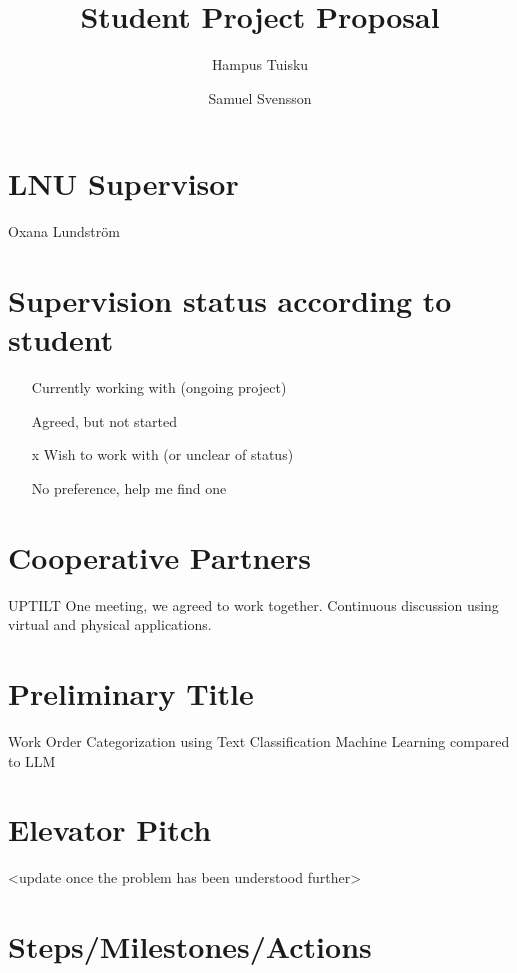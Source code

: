 \documentclass{article}
\title{Student Project Proposal}
\author{Hampus Tuisku \and Samuel Svensson}
\begin{document}
\maketitle

\section{LNU Supervisor}
Oxana Lundström

\section{Supervision status according to student}

\begin{itemize}
\item [ ] Currently working with (ongoing project)
\item [ ] Agreed, but not started
\item [x] Wish to work with (or unclear of status)
\item [ ] No preference, help me find one
\end{itemize}

\section{Cooperative Partners}

UPTILT
One meeting, we agreed to work together. Continuous discussion using virtual and physical applications.

\section{Preliminary Title}

Work Order Categorization using Text Classification Machine Learning compared to LLM

\section{Elevator Pitch}

<update once the problem has been understood further>

\section{Steps/Milestones/Actions}
\end{document}
